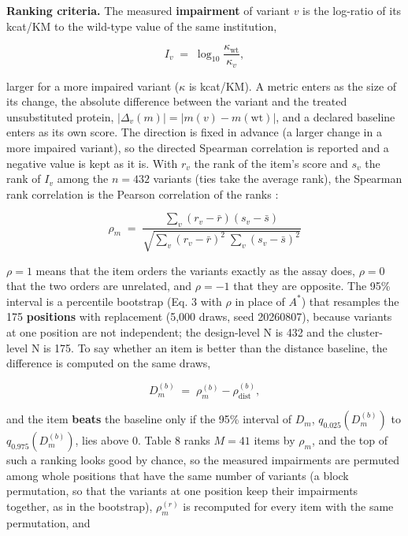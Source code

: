 \documentclass[
  10pt,
]{article}
\DeclareRobustCommand{\_}{\textunderscore\hspace{0pt}}
\begin{document}
\textbf{Ranking
criteria.} The
measured
\textbf{impairment}
of variant \(v\) is
the log-ratio of its
kcat/KM to the
wild-type value of
the same
institution,

\begin{equation*}I_v \;=\; \log_{10}\frac{\kappa_{\mathrm{wt}}}{\kappa_{v}}, \tag{11}\end{equation*}

larger for a more
impaired variant
(\(\kappa\) is
kcat/KM). A metric
enters as the size
of its change, the
absolute difference
between the variant
and the treated
unsubstituted
protein,
\(\lvert\Delta_v(m)\rvert = \lvert m(v) - m(\mathrm{wt})\rvert\),
and a declared
baseline enters as
its own score. The
direction is fixed
in advance (a larger
change in a more
impaired variant),
so the directed
Spearman correlation
is reported and a
negative value is
kept as it is. With
\(r_v\) the rank of
the item's score and
\(s_v\) the rank of
\(I_v\) among the
\(n = 432\) variants
(ties take the
average rank), the
Spearman rank
correlation is the
Pearson correlation
of the ranks
\cite{spearman1904}:

\begin{equation*}\rho_m \;=\; \frac{\sum_{v}(r_v-\bar r)(s_v-\bar s)}{\sqrt{\sum_{v}(r_v-\bar r)^2\;\sum_{v}(s_v-\bar s)^2}} \tag{12}\end{equation*}

\(\rho = 1\) means
that the item orders
the variants exactly
as the assay does,
\(\rho = 0\) that
the two orders are
unrelated, and
\(\rho = -1\) that
they are opposite.
The 95\% interval is
a percentile
bootstrap (Eq. 3
with \(\rho\) in
place of \(A^{*}\))
that resamples the
175
\textbf{positions}
with replacement
(5,000 draws, seed
20260807), because
variants at one
position are not
independent; the
design-level N is
432 and the
cluster-level N is
175. To say whether
an item is better
than the distance
baseline, the
difference is
computed on the same
draws,

\begin{equation*}D_m^{(b)} \;=\; \rho_m^{(b)} - \rho_{\mathrm{dist}}^{(b)}, \tag{13}\end{equation*}

and the item
\textbf{beats} the
baseline only if the
95\% interval of
\(D_m\),
\(q_{0.025}(D_m^{(b)})\)
to
\(q_{0.975}(D_m^{(b)})\),
lies above 0. Table
8 ranks \(M = 41\)
items by \(\rho_m\),
and the top of such
a ranking looks good
by chance, so the
measured impairments
are permuted among
whole positions that
have the same number
of variants (a block
permutation, so that
the variants at one
position keep their
impairments
together, as in the
bootstrap),
\(\rho^{(r)}_m\) is
recomputed for every
item with the same
permutation, and
\end{document}
